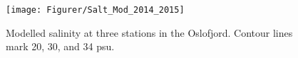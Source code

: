 \begin{figure}[htb]
	\centerline{
		\texttt{[image: Figurer/Salt\_Mod\_2014\_2015]} }
	\caption{\small Modelled salinity at three stations in the Oslofjord. Contour lines mark 20, 30, and 34 psu.}
	\label{fig:Salt_Mod_2014_2015}
\end{figure}

